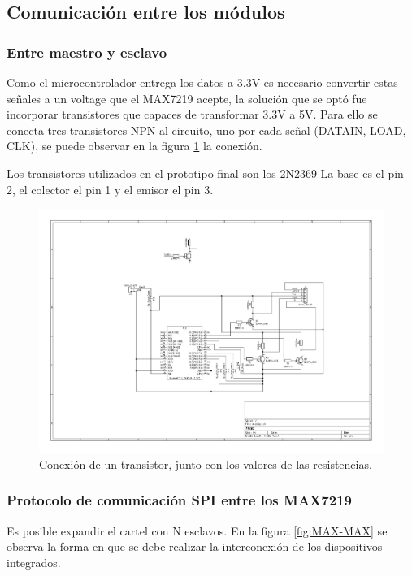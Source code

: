 \subsection{Comunicación entre los módulos}

\subsubsection{Entre maestro y esclavo}
Como el microcontrolador entrega los datos a 3.3V es necesario convertir estas señales a un voltage que el MAX7219 acepte, la solución que se optó fue incorporar transistores que capaces de transformar 3.3V a 5V. Para ello se conecta tres transistores NPN al circuito, uno por cada señal (DATAIN, LOAD, CLK), se puede observar en la figura \ref{fig:transistors} la conexión.

Los transistores utilizados en el prototipo final son los 2N2369 %
La base es el pin 2, el colector el pin 1 y el emisor el pin 3.
\begin{figure}[ht!]
	\centering
	\begin{center}
		\includegraphics[scale=2]{imagenes/hw/transistor.pdf}
		\caption{Conexión de un transistor, junto con los valores de las resistencias.}
		\label{fig:transistors}
	\end{center}
\end{figure}

\subsubsection{Protocolo de comunicación SPI entre los MAX7219} \label{sec:comunicacion}
Es posible expandir el cartel con N esclavos. En la figura \ref{fig:MAX-MAX} se observa la forma en que se debe realizar la interconexión de los dispositivos integrados.

